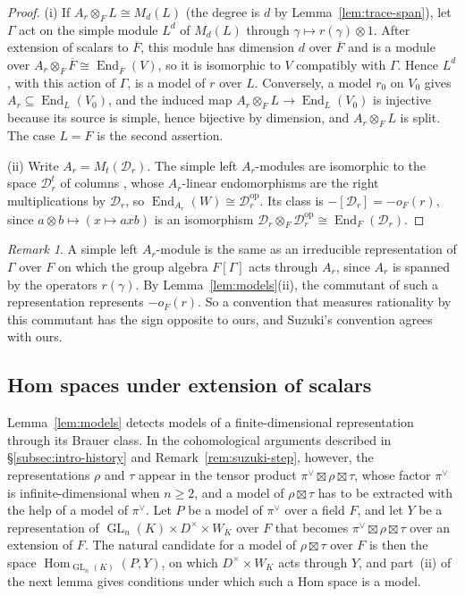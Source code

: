 \documentclass[a4paper,11pt]{amsart}
\theoremstyle{definition}
\theoremstyle{remark}
\newtheorem{remark}[theorem]{Remark}
\numberwithin{equation}{section}
\DeclareMathOperator{\End}{End}
\DeclareMathOperator{\GL}{GL}
\newcommand{\op}{\mathrm{op}}
\DeclareMathOperator{\Hom}{Hom}
\begin{document}
\begin{proof}
(i) If $A_r\otimes_FL\cong M_d(L)$ (the degree is $d$ by Lemma~\ref{lem:trace-span}), let $\Gamma$ act on the simple module $L^d$ of $M_d(L)$ through $\gamma\mapsto r(\gamma)\otimes1$. After extension of scalars to $\overline F$, this module has dimension $d$ over $\overline F$ and is a module over $A_r\otimes_F\overline F\cong\End_{\overline F}(V)$, so it is isomorphic to $V$ compatibly with $\Gamma$. Hence $L^d$, with this action of $\Gamma$, is a model of $r$ over $L$. Conversely, a model $r_0$ on $V_0$ gives $A_r\subseteq\End_L(V_0)$, and the induced map $A_r\otimes_FL\to\End_L(V_0)$ is injective because its source is simple, hence bijective by dimension, and $A_r\otimes_FL$ is split. The case $L=F$ is the second assertion.

(ii) Write $A_r=M_t(\mathcal D_r)$. The simple left $A_r$-modules are isomorphic to the space $\mathcal D_r^t$ of columns \cite[IV, Example~1.11 and Corollaries~1.21 and~1.22]{Mil20}, whose $A_r$-linear endomorphisms are the right multiplications by $\mathcal D_r$, so $\End_{A_r}(W)\cong\mathcal D_r^{\op}$. Its class is $-[\mathcal D_r]=-o_F(r)$, since $a\otimes b\mapsto(x\mapsto axb)$ is an isomorphism $\mathcal D_r\otimes_F\mathcal D_r^{\op}\cong\End_F(\mathcal D_r)$.
\end{proof}

\begin{remark}\label{rem:sign-module}
A simple left $A_r$-module is the same as an irreducible representation of $\Gamma$ over $F$ on which the group algebra $F[\Gamma]$ acts through $A_r$, since $A_r$ is spanned by the operators $r(\gamma)$. By Lemma~\ref{lem:models}(ii), the commutant of such a representation represents $-o_F(r)$. So a convention that measures rationality by this commutant has the sign opposite to ours, and Suzuki's convention agrees with ours.
\end{remark}

\subsection{Hom spaces under extension of scalars}\label{subsec:hom-spaces}

Lemma~\ref{lem:models} detects models of a finite-dimensional representation through its Brauer class. In the cohomological arguments described in \S\ref{subsec:intro-history} and Remark~\ref{rem:suzuki-step}, however, the representations $\rho$ and $\tau$ appear in the tensor product $\pi^\vee\boxtimes\rho\boxtimes\tau$, whose factor $\pi^\vee$ is infinite-dimensional when $n\geq2$, and a model of $\rho\boxtimes\tau$ has to be extracted with the help of a model of $\pi^\vee$. Let $P$ be a model of $\pi^\vee$ over a field $F$, and let $Y$ be a representation of $\GL_n(K)\times D^\times\times W_K$ over $F$ that becomes $\pi^\vee\boxtimes\rho\boxtimes\tau$ over an extension of $F$. The natural candidate for a model of $\rho\boxtimes\tau$ over $F$ is then the space $\Hom_{\GL_n(K)}(P,Y)$, on which $D^\times\times W_K$ acts through $Y$, and part~(ii) of the next lemma gives conditions under which such a Hom space is a model.
\end{document}
